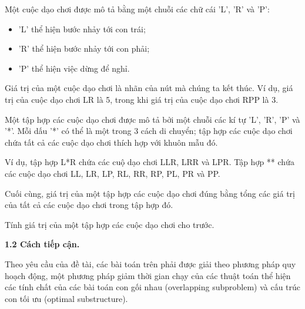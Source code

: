 \begin{enumerate}
	\vspace{-0.15cm}
	Một cuộc dạo chơi được mô tả bằng một chuỗi các chữ cái 'L', 'R' và 'P':

	
	\vspace{-0.4cm}
	\begin{itemize}
		\item 'L' thể hiện bước nhảy tới con trái;
		\vspace{-0.1cm}
		\item 'R' thể hiện bước nhảy tới con phải;
		\vspace{-0.1cm}
		\item 'P' thể hiện việc dừng để nghỉ.
	\end{itemize}
	
	\vspace{-0.35cm}
	Giá trị của một cuộc dạo chơi là nhãn của nút mà chúng ta kết thúc. Ví dụ, giá trị của cuộc dạo chơi LR là 5, trong khi giá trị của cuộc dạo chơi RPP là 3.
	
	\vspace{-0.1cm}
	Một tập hợp các cuộc dạo chơi được mô tả bởi một chuỗi các kí tự 'L', 'R', 'P' và '*'. Mỗi dấu '*' có	thể là một trong 3 cách di chuyển; tập hợp các cuộc dạo chơi chứa tất cả các cuộc dạo chơi thích hợp với khuôn mẫu đó.
	
	\vspace{-0.1cm}
	Ví dụ, tập hợp L*R chứa các cuộ dạo chơi LLR, LRR và LPR. Tập hợp ** chứa các cuộc dạo chơi LL, LR, LP, RL, RR, RP, PL, PR và PP.
	
	\vspace{-0.1cm}
	Cuối cùng, giá trị của một tập hợp các cuộc dạo chơi đúng bằng tổng các giá trị của tất cả các cuộc	dạo chơi trong tập hợp đó.
	
	\vspace{-0.1cm}
	Tính giá trị của một tập hợp các cuộc dạo chơi cho trước.
\end{enumerate}

\bigskip
\changefontsizes{14pt}

\setlength{\parindent}{0.0cm}
\textbf{1.2 Cách tiếp cận.}


\smallskip
\changefontsizes{13pt}
\setlength{\parindent}{1cm}

Theo yêu cầu của đề tài, các bài toán trên phải được giải theo phương pháp quy hoạch động, một phương pháp giảm thời gian chạy của các thuật toán thể hiện các tính chất của các bài toán con gối nhau (overlapping subproblem) và cấu trúc con tối ưu (optimal substructure).

